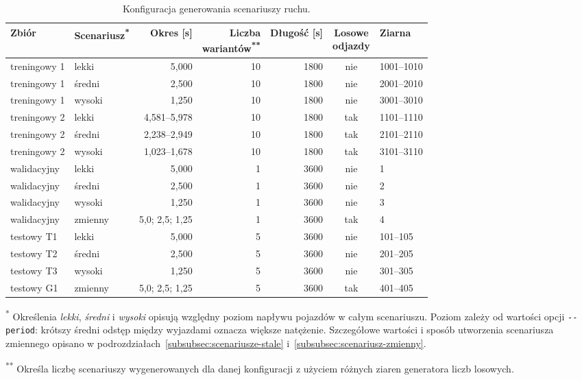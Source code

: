 \begin{table}[!htbp] \centering
    \caption{Konfiguracja generowania scenariuszy ruchu.}
    \label{tab:scenariusze}
    \footnotesize
    \begin{tabular}{| l | l | r | r | r | c | l |} \hline
        Zbiór & Scenariusz\textsuperscript{*} & Okres [s] & \shortstack{Liczba\\wariantów\textsuperscript{**}} & Długość [s] & \shortstack{Losowe\\odjazdy} & Ziarna \\ \hline\hline
        treningowy 1 & lekki   & 5,000 & 10 & 1800 & nie & 1001--1010 \\ \hline
        treningowy 1 & średni  & 2,500 & 10 & 1800 & nie & 2001--2010 \\ \hline
        treningowy 1 & wysoki  & 1,250 & 10 & 1800 & nie & 3001--3010 \\ \hline
        treningowy 2 & lekki   & 4,581--5,978 & 10 & 1800 & tak & 1101--1110 \\ \hline
        treningowy 2 & średni  & 2,238--2,949 & 10 & 1800 & tak & 2101--2110 \\ \hline
        treningowy 2 & wysoki  & 1,023--1,678 & 10 & 1800 & tak & 3101--3110 \\ \hline
        walidacyjny  & lekki   & 5,000 & 1  & 3600 & nie & 1 \\ \hline
        walidacyjny  & średni  & 2,500 & 1  & 3600 & nie & 2 \\ \hline
        walidacyjny  & wysoki  & 1,250 & 1  & 3600 & nie & 3 \\ \hline
        walidacyjny  & zmienny & 5,0; 2,5; 1,25 & 1 & 3600 & tak & 4 \\ \hline
        testowy T1   & lekki   & 5,000 & 5  & 3600 & nie & 101--105 \\ \hline
        testowy T2   & średni  & 2,500 & 5  & 3600 & nie & 201--205 \\ \hline
        testowy T3   & wysoki  & 1,250 & 5  & 3600 & nie & 301--305 \\ \hline
        testowy G1   & zmienny & 5,0; 2,5; 1,25 & 5 & 3600 & tak & 401--405 \\ \hline
    \end{tabular}
    \par\smallskip
    {\raggedright\footnotesize
    \textsuperscript{*} Określenia \emph{lekki}, \emph{średni} i \emph{wysoki} opisują względny poziom napływu pojazdów w całym scenariuszu. Poziom zależy od wartości opcji \texttt{-{}-period}: krótszy średni odstęp między wyjazdami oznacza większe natężenie. Szczegółowe wartości i sposób utworzenia scenariusza zmiennego opisano w podrozdziałach~\ref{subsubsec:scenariusze-stale} i~\ref{subsubsec:scenariusz-zmienny}.\par}

    \textsuperscript{**} Określa liczbę scenariuszy wygenerowanych dla danej konfiguracji z użyciem różnych ziaren generatora liczb losowych.
\end{table}

